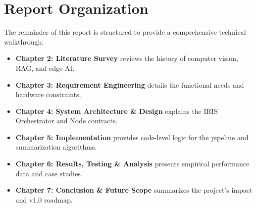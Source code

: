 \section{Report Organization}
The remainder of this report is structured to provide a comprehensive technical walkthrough:
\begin{itemize}
    \item \textbf{Chapter 2: Literature Survey} reviews the history of computer vision, RAG, and edge-AI.
    \item \textbf{Chapter 3: Requirement Engineering} details the functional needs and hardware constraints.
    \item \textbf{Chapter 4: System Architecture \& Design} explains the IRIS Orchestrator and Node contracts.
    \item \textbf{Chapter 5: Implementation} provides code-level logic for the pipeline and summarization algorithms.
    \item \textbf{Chapter 6: Results, Testing \& Analysis} presents empirical performance data and case studies.
    \item \textbf{Chapter 7: Conclusion \& Future Scope} summarizes the project's impact and v1.0 roadmap.
\end{itemize}
